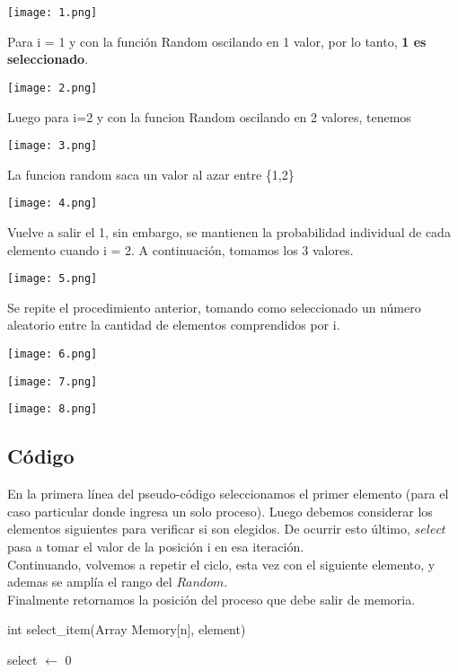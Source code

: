 \documentclass[11pt]{article}
\begin{document}
\begin{center}\texttt{[image: 1.png]}\end{center}
Para i = 1 y con la función Random oscilando en 1 valor, por lo tanto, \textbf{1 es seleccionado}.
\begin{center}\texttt{[image: 2.png]}\end{center}
Luego para i=2 y con la funcion Random oscilando en 2 valores, tenemos
\begin{center}\texttt{[image: 3.png]}\end{center}
La funcion random saca un valor al azar entre \{1,2\}
\begin{center}\texttt{[image: 4.png]}\end{center}
Vuelve a salir el 1, sin embargo, se mantienen la probabilidad individual de cada elemento cuando i = 2. A continuación, tomamos los 3 valores.
\begin{center}\texttt{[image: 5.png]}\end{center}
Se repite el procedimiento anterior, tomando como seleccionado un número aleatorio entre la cantidad de elementos comprendidos por i.
\begin{center}\texttt{[image: 6.png]}\end{center}
\begin{center}\texttt{[image: 7.png]}\end{center}
\begin{center}\texttt{[image: 8.png]}\end{center}
\subsection{Código}  
En la primera línea del pseudo-código seleccionamos el primer elemento (para el caso particular donde ingresa un solo proceso). Luego debemos considerar los elementos siguientes para verificar si son elegidos. De ocurrir esto último, $select$ pasa a tomar el valor de la posición i en esa iteración.\\
Continuando, volvemos a repetir el ciclo, esta vez con el siguiente elemento, y ademas se amplía el rango del $Random$.\\Finalmente retornamos la posición del proceso que debe salir de memoria.\\

\begin{algorithm}[H]

\caption{int select\_item(Array Memory[n], element)}
select $\leftarrow$ 0 \\

\end{algorithm}
\end{document}
